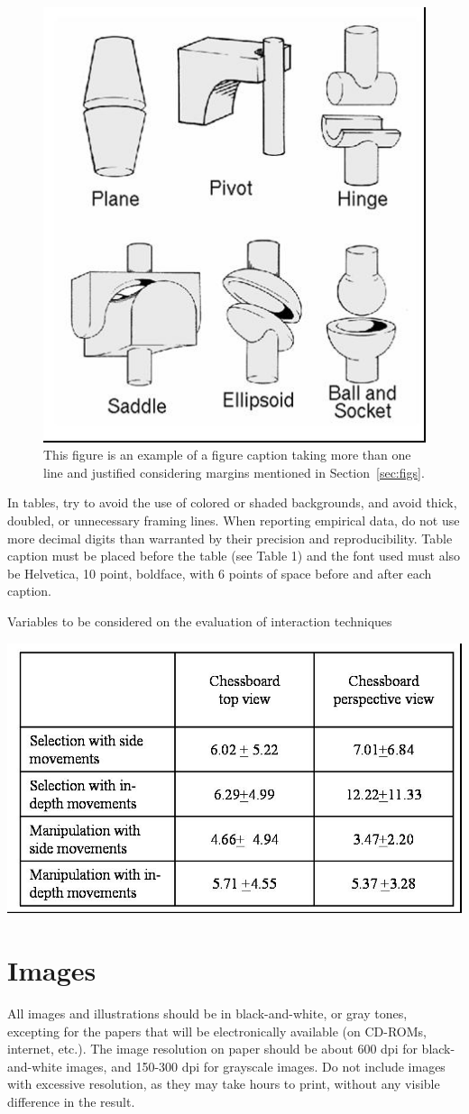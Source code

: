 \documentclass[12pt]{article}
\begin{document}
\begin{figure}[ht]
\centering
\includegraphics[width=.3\textwidth]{fig2.jpg}
\caption{This figure is an example of a figure caption taking more than one
  line and justified considering margins mentioned in Section~\ref{sec:figs}.}
\label{fig:exampleFig2}
\end{figure}

In tables, try to avoid the use of colored or shaded backgrounds, and avoid
thick, doubled, or unnecessary framing lines. When reporting empirical data,
do not use more decimal digits than warranted by their precision and
reproducibility. Table caption must be placed before the table (see Table 1)
and the font used must also be Helvetica, 10 point, boldface, with 6 points of
space before and after each caption.

\begin{table}[ht]
\centering
\caption{Variables to be considered on the evaluation of interaction
  techniques}
\label{tab:exTable1}
\includegraphics[width=.7\textwidth]{table.jpg}
\end{table}

\section{Images}

All images and illustrations should be in black-and-white, or gray tones,
excepting for the papers that will be electronically available (on CD-ROMs,
internet, etc.). The image resolution on paper should be about 600 dpi for
black-and-white images, and 150-300 dpi for grayscale images.  Do not include
images with excessive resolution, as they may take hours to print, without any
visible difference in the result. 
\end{document}
